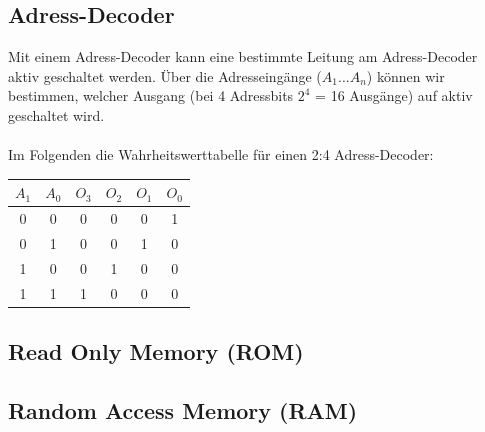 \documentclass{report}
\begin{document}
\subsection{Adress-Decoder}
Mit einem Adress-Decoder kann eine bestimmte Leitung am Adress-Decoder aktiv geschaltet werden. Über die Adresseingänge ($A_1 ... A_n$) können wir bestimmen, welcher Ausgang (bei 4 Adressbits $2^4$ = 16 Ausgänge) auf aktiv geschaltet wird.
\\\\
Im Folgenden die Wahrheitswerttabelle für einen 2:4 Adress-Decoder:
\begin{center}\begin{tabular}{c c | c c c c}
$A_1$ & $A_0$ & $O_3$ & $O_2$ & $O_1$ & $O_0$ \\ \hline
0 & 0 & 0 & 0 & 0 & 1\\
0 & 1 & 0 & 0 & 1 & 0\\
1 & 0 & 0 & 1 & 0 & 0\\
1 & 1 & 1 & 0 & 0 & 0\end{tabular}\end{center}
\subsection{Read Only Memory (ROM)}

\subsection{Random Access Memory (RAM)}
\end{document}
